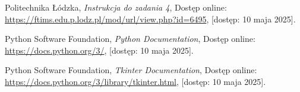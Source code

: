 \documentclass{article}
\begin{document}
    


\begin{thebibliography}{9}

    Politechnika Łódzka, 
    \emph{Instrukcja do zadania 4}, 
    Dostęp online: \url{https://ftims.edu.p.lodz.pl/mod/url/view.php?id=6495}, 
    [dostęp: 10 maja 2025].


    Python Software Foundation, 
    \emph{Python Documentation}, 
    Dostęp online: \url{https://docs.python.org/3/}, 
    [dostęp: 10 maja 2025].

    Python Software Foundation, 
    \emph{Tkinter Documentation}, 
    Dostęp online: \url{https://docs.python.org/3/library/tkinter.html}, 
    [dostęp: 10 maja 2025].

\end{thebibliography}
\end{document}
